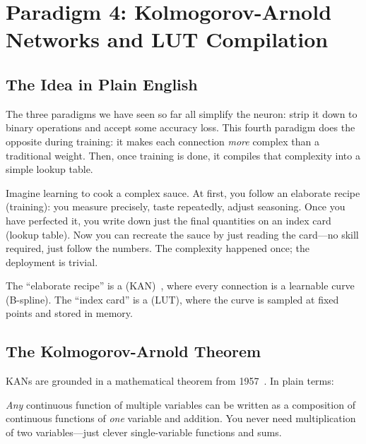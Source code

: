 \section{Paradigm 4: Kolmogorov-Arnold Networks and LUT Compilation}
\label{sec:kan}

\subsection{The Idea in Plain English}

The three paradigms we have seen so far all simplify the neuron: strip
it down to binary operations and accept some accuracy loss. This
fourth paradigm does the opposite during training: it makes each
connection \emph{more} complex than a traditional weight. Then, once
training is done, it compiles that complexity into a simple lookup
table.

\begin{analogy}
Imagine learning to cook a complex sauce. At first, you follow an
elaborate recipe (training): you measure precisely, taste repeatedly,
adjust seasoning. Once you have perfected it, you write down just
the final quantities on an index card (lookup table). Now you can
recreate the sauce by just reading the card---no skill required,
just follow the numbers. The complexity happened once; the
deployment is trivial.
\end{analogy}

The ``elaborate recipe'' is a 
(KAN)~\cite{liu2024kan}, where every connection is a learnable curve (B-spline). The
``index card'' is a  (LUT), where the curve is
sampled at fixed points and stored in memory.

\subsection{The Kolmogorov-Arnold Theorem}

KANs are grounded in a mathematical theorem from 1957~\cite{kolmogorov1957}. In plain
terms:

\begin{keyinsight}[title={Kolmogorov-Arnold Representation Theorem~\cite{kolmogorov1957}}]
\emph{Any} continuous function of multiple variables can be written as
a composition of continuous functions of \emph{one} variable and
addition. You never need multiplication of two variables---just
clever single-variable functions and sums.
\end{keyinsight}


